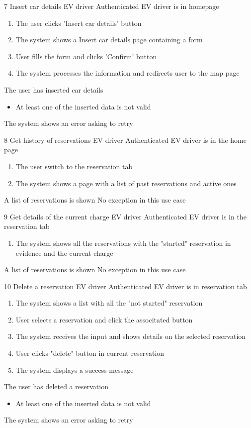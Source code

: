 \usecase
{7}
{Insert car details}
{EV driver}
{Authenticated EV driver is in homepage}
{
    \begin{enumerate}
        \item The user clicks 'Insert car details' button
        \item The system shows a Insert car details page containing a form
        \item User fills the form and clicks 'Confirm' button
        \item The system processes the information and redirects user to the map page
    \end{enumerate}
}
{The user has inserted car details}
{
    \begin{itemize}
        \item At least one of the inserted data is not valid
    \end{itemize}
}
{
    The system shows an error asking to retry
}

\usecase
{8}
{Get history of reservations}
{EV driver}
{Authenticated EV driver is in the home page}
{
    \begin{enumerate}
        \item The user switch to the reservation tab
        \item The system shows a page with a list of past reservations and active ones
    \end{enumerate}
}
{A list of reservations is shown}
{
    No exception in this use case
}
{
}

\usecase
{9}
{Get details of the current charge}
{EV driver}
{Authenticated EV driver is in the reservation tab}
{
    \begin{enumerate}
        \item The system shows all the reservations with the "started" reservation in evidence and the current charge
    \end{enumerate}
}
{A list of reservations is shown}
{
    No exception in this use case
}
{
}

\usecase
{10}
{Delete a reservation}
{EV driver}
{Authenticated EV driver is in reservation tab}
{
    \begin{enumerate}
        \item The system shows a list with all the "not started" reservation
        \item User selects a reservation and click the associtated button
        \item The system receives the input and shows details on the selected reservation
        \item User clicks "delete" button in current reservation
        \item The system displays a success message
    \end{enumerate}
}
{The user has deleted a reservation}
{
    \begin{itemize}
        \item At least one of the inserted data is not valid
    \end{itemize}
}
{
    The system shows an error asking to retry
}


